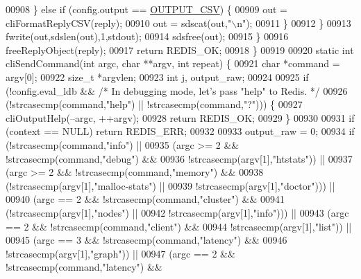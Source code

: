 \begin{DoxyCode}
{{{{{{{{{{{{{{{{{{{{{{{{{{{00908             \} \textcolor{keywordflow}{else} \textcolor{keywordflow}{if} (config.output == \hyperlink{redis-cli_8c_a55fcc3cb9516c34eebf22ac9f8ebf3a2}{OUTPUT\_CSV}) \{
00909                 out = cliFormatReplyCSV(reply);
00910                 out = sdscat(out,\textcolor{stringliteral}{"\(\backslash\)n"});
00911             \}
00912         \}
00913         fwrite(out,sdslen(out),1,stdout);
00914         sdsfree(out);
00915     \}
00916     freeReplyObject(reply);
00917     \textcolor{keywordflow}{return} REDIS\_OK;
00918 \}
00919 
00920 \textcolor{keyword}{static} \textcolor{keywordtype}{int} cliSendCommand(\textcolor{keywordtype}{int} argc, \textcolor{keywordtype}{char} **argv, \textcolor{keywordtype}{int} repeat) \{
00921     \textcolor{keywordtype}{char} *command = argv[0];
00922     size\_t *argvlen;
00923     \textcolor{keywordtype}{int} j, output\_raw;
00924 
00925     \textcolor{keywordflow}{if} (!config.eval\_ldb && \textcolor{comment}{/* In debugging mode, let's pass "help" to Redis. */}
00926         (!strcasecmp(command,\textcolor{stringliteral}{"help"}) || !strcasecmp(command,\textcolor{stringliteral}{"?"}))) \{
00927         cliOutputHelp(--argc, ++argv);
00928         \textcolor{keywordflow}{return} REDIS\_OK;
00929     \}
00930 
00931     \textcolor{keywordflow}{if} (context == NULL) \textcolor{keywordflow}{return} REDIS\_ERR;
00932 
00933     output\_raw = 0;
00934     \textcolor{keywordflow}{if} (!strcasecmp(command,\textcolor{stringliteral}{"info"}) ||
00935         (argc >= 2 && !strcasecmp(command,\textcolor{stringliteral}{"debug"}) &&
00936                        !strcasecmp(argv[1],\textcolor{stringliteral}{"htstats"})) ||
00937         (argc >= 2 && !strcasecmp(command,\textcolor{stringliteral}{"memory"}) &&
00938                       (!strcasecmp(argv[1],\textcolor{stringliteral}{"malloc-stats"}) ||
00939                        !strcasecmp(argv[1],\textcolor{stringliteral}{"doctor"}))) ||
00940         (argc == 2 && !strcasecmp(command,\textcolor{stringliteral}{"cluster"}) &&
00941                       (!strcasecmp(argv[1],\textcolor{stringliteral}{"nodes"}) ||
00942                        !strcasecmp(argv[1],\textcolor{stringliteral}{"info"}))) ||
00943         (argc == 2 && !strcasecmp(command,\textcolor{stringliteral}{"client"}) &&
00944                        !strcasecmp(argv[1],\textcolor{stringliteral}{"list"})) ||
00945         (argc == 3 && !strcasecmp(command,\textcolor{stringliteral}{"latency"}) &&
00946                        !strcasecmp(argv[1],\textcolor{stringliteral}{"graph"})) ||
00947         (argc == 2 && !strcasecmp(command,\textcolor{stringliteral}{"latency"}) &&
}}}}}}}}}}}}}}}}}}}}}}}}}}}
\end{DoxyCode}
